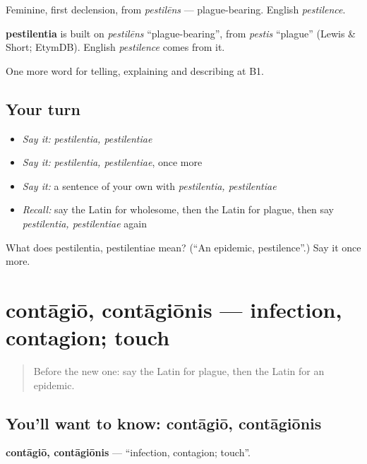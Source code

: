 Feminine, first declension, from \emph{pestilēns} — plague-bearing. English \emph{pestilence}.

\begin{cousinweb}
\textbf{pestilentia} is built on \emph{pestilēns} \textquotedblleft{}plague-bearing\textquotedblright{}, from \emph{pestis} \textquotedblleft{}plague\textquotedblright{} (Lewis \& Short; EtymDB). English \emph{pestilence} comes from it.
\end{cousinweb}

\begin{grammarlens}[title={What you've built}]
One more word for telling, explaining and describing at B1.
\end{grammarlens}

\subsection*{Your turn}
\begin{itemize}
\raggedright
  \item \emph{Say it:} \emph{pestilentia, pestilentiae}
  \item \emph{Say it:} \emph{pestilentia, pestilentiae}, once more
  \item \emph{Say it:} a sentence of your own with \emph{pestilentia, pestilentiae}
  \item \emph{Recall:} say the Latin for wholesome, then the Latin for plague, then say \emph{pestilentia, pestilentiae} again
\end{itemize}

\begin{tcolorbox}[breakable,colback=teal!4,colframe=teal!35!black,title={Before you move on}]
What does pestilentia, pestilentiae mean? (\textquotedblleft{}An epidemic, pestilence\textquotedblright{}.) Say it once more.
\end{tcolorbox}
\section[contāgiō, contāgiōnis]{contāgiō, contāgiōnis — infection, contagion; touch}

\label{lesson:LA-C524-contagio}



\begin{quote}
Before the new one: say the Latin for plague, then the Latin for an epidemic.
\end{quote}

\subsection*{You'll want to know: contāgiō, contāgiōnis}
\textbf{contāgiō, contāgiōnis} — \textquotedblleft{}infection, contagion; touch\textquotedblright{}.

